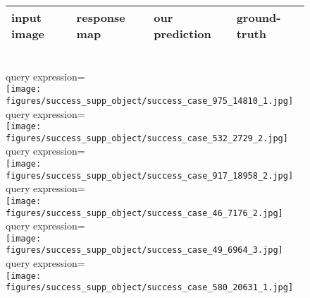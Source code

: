 \documentclass[runningheads]{llncs}
\begin{document}
\begin{figure}[t]
\centering
\begin{tabularx}{0.95\linewidth}{YYYY}
input image & response map & our prediction & ground-truth \\ \hline
\end{tabularx} \\
\small{query expression=} \\
\texttt{[image: figures/success\_supp\_object/success\_case\_975\_14810\_1.jpg]} \\
\small{query expression=} \\
\texttt{[image: figures/success\_supp\_object/success\_case\_532\_2729\_2.jpg]} \\
\small{query expression=} \\
\texttt{[image: figures/success\_supp\_object/success\_case\_917\_18958\_2.jpg]} \\
\small{query expression=} \\
\texttt{[image: figures/success\_supp\_object/success\_case\_46\_7176\_2.jpg]} \\
\small{query expression=} \\
\texttt{[image: figures/success\_supp\_object/success\_case\_49\_6964\_3.jpg]} \\
\small{query expression=} \\
\texttt{[image: figures/success\_supp\_object/success\_case\_580\_20631\_1.jpg]} \\
\end{figure}
\end{document}
